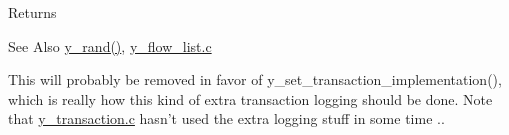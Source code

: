 \begin{DoxyRefList}
\begin{DoxyReturn}{Returns}
\end{DoxyReturn}
\begin{DoxySeeAlso}{See Also}
\hyperlink{group__core_ga0419985b32761cce3f5d75e6aad36f05}{y\-\_\-rand()}, \hyperlink{y__flow__list_8c}{y\-\_\-flow\-\_\-list.\-c}  
\end{DoxySeeAlso}

\item[\label{deprecated__deprecated000010}%
\hypertarget{deprecated__deprecated000010}{}%
Member \hyperlink{y__logging_8c_ad22b9fb4ae6f4a47b69cd37b9f33ceff}{y\-\_\-setup\-\_\-logging} ()]This will probably be removed in favor of y\-\_\-set\-\_\-transaction\-\_\-implementation(), which is really how this kind of extra transaction logging should be done. Note that \hyperlink{y__transaction_8c}{y\-\_\-transaction.\-c} hasn't used the extra logging stuff in some time ..
\end{DoxyRefList}